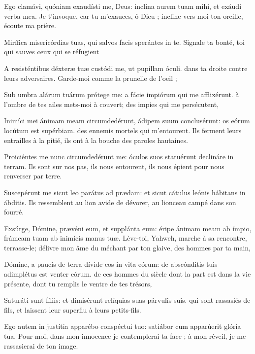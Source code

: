 \begin{paracol}{2}

\LigneParacol{0cm}
{Ego clamávi, quóniam exaudísti me, Deus: \GreStar{} inclína aurem tuam mihi, et exáudi verba mea.}
{Je t'invoque, car tu m'exauces, ô Dieu ; incline vers moi ton oreille, écoute ma prière. }

\LigneParacol{0.2cm}
{Mirífica misericórdias tuas, \GreStar{} qui salvos facis sperántes in te.}
{Signale ta bonté, toi qui sauves ceux qui se réfugient}

\LigneParacol{0.2cm}
{A resisténtibus déxteræ tuæ custódi me, \GreStar{} ut pupíllam óculi.}
{dans ta droite contre leurs adversaires. Garde-moi comme la prunelle de l'oeil ;}

\LigneParacol{0.2cm}
{Sub umbra alárum tuárum prótege me: \GreStar{} a fácie impiórum qui me afflixérunt.}
{à l'ombre de tes ailes mets-moi à couvert; des impies qui me persécutent,}

\LigneParacol{0.2cm}
{Inimíci mei ánimam meam circumdedérunt, ádipem suum conclusérunt: \GreStar{} os eórum locútum est supérbiam.}
{des ennemis mortels qui m'entourent. Ils ferment leurs entrailles à la pitié, ils ont à la bouche des paroles hautaines. }

\LigneParacol{0.2cm}
{Proiciéntes me nunc circumdedérunt me: \GreStar{} óculos suos statuérunt declináre in terram.}
{Ils sont sur nos pas, ils nous entourent, ils nous épient pour nous renverser par terre. }

\LigneParacol{0.2cm}
{Suscepérunt me sicut leo parátus ad prædam: \GreStar{} et sicut cátulus leónis hábitans in ábditis.}
{Ils ressemblent au lion avide de dévorer, au lionceau campé dans son fourré. }

\end{paracol}
\Gloria
\begin{paracol}{2}

\LigneParacol{0cm}
{Exsúrge, Dómine, prævéni eum, et supplánta eum: \GreStar{} éripe ánimam meam ab ímpio, frámeam tuam ab inimícis manus tuæ.}
{Lève-toi, Yahweh, marche à sa rencontre, terrasse-le; délivre mon âme du méchant par ton glaive, des hommes par ta main,}

\LigneParacol{0.2cm}
{Dómine, a paucis de terra dívide eos in vita eórum: \GreStar{} de abscónditis tuis adimplétus est venter eórum.}
{de ces hommes du siècle dont la part est dans la vie présente, dont tu remplis le ventre de tes trésors,}

\LigneParacol{0.2cm}
{Saturáti sunt fíliis: \GreStar{} et dimisérunt relíquias suas párvulis suis.}
{qui sont rassasiés de fils, et laissent leur superflu à leurs petits-fils. }

\LigneParacol{0.2cm}
{Ego autem in justítia apparébo conspéctui tuo: \GreStar{} satiábor cum apparúerit glória tua.}
{Pour moi, dans mon innocence je contemplerai ta face ; à mon réveil, je me rassasierai de ton image. }

\end{paracol}
